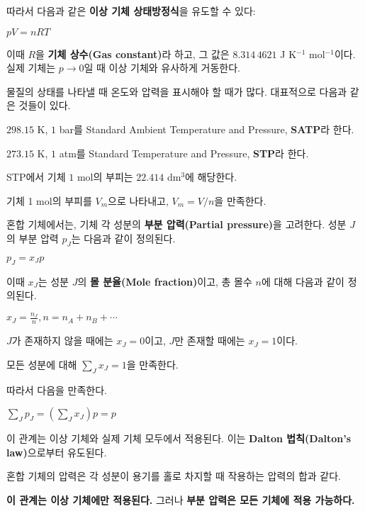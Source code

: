             따라서 다음과 같은 \textbf{이상 기체 상태방정식}을 유도할 수 있다:
                \begin{thm}[이상 기체 상태방정식]
                    $pV = nRT$
                \end{thm}
            이때 $R$을 \textbf{기체 상수(Gas constant)}라 하고, 그 값은 $8.314\,4621$ \textrm{J K$^{-1}$ mol$^{-1}$}이다. 
            실제 기체는 $p \rightarrow 0$일 때 이상 기체와 유사하게 거동한다.
            \par 물질의 상태를 나타낼 때 온도와 압력을 표시해야 할 때가 많다. 대표적으로 다음과 같은 것들이 있다.
            \begin{defn}[SATP]
                $298.15$ \textrm{K}, $1$ \textrm{bar}를 Standard Ambient Temperature and Pressure, \textbf{SATP}라 한다.
            \end{defn}
            \begin{defn}[STP]
            $273.15$ \textrm{K}, $1$ \textrm{atm}를 Standard Temperature and Pressure, \textbf{STP}라 한다.
            \end{defn}
            STP에서 기체 $1$ \textrm{mol}의 부피는 
            $22.414$ \textrm{dm}$^3$에 해당한다.
            \begin{defn}[몰 부피]
            기체 1 \textrm{mol}의 부피를 $V_m$으로 나타내고, $V_m = V/n$을 만족한다.
            \end{defn}
            \par 혼합 기체에서는, 기체 각 성분의 \textbf{부분 압력(Partial pressure)}을 고려한다. 성분 $J$의 부분 압력 $p_J$는 다음과 같이 정의된다.
            \begin{defn}[부분 압력]
                $p_J = x_J p$
            \end{defn}
            이때 $x_J$는 성분 $J$의 \textbf{몰 분율(Mole fraction)}이고, 총 몰수 $n$에 대해 다음과 같이 정의된다.
                \begin{defn}[몰 분율]
                    $x_J = \displaystyle\frac{n_J}{n}, n = n_A + n_B + \cdots$
                \end{defn}
            $J$가 존재하지 않을 때에는 $x_J = 0$이고, $J$만 존재할 때에는 $x_J = 1$이다. 
            \begin{cor}
                모든 성분에 대해 $\displaystyle\sum_{J} x_J = 1$을 만족한다.
            \end{cor} 
            따라서 다음을 만족한다.
                \begin{cor}
                    $\displaystyle\sum_{J} p_J = \left( \sum_{J} x_J \right) p = p$
                \end{cor}
            이 관계는 이상 기체와 실제 기체 모두에서 적용된다. 이는 \textbf{Dalton 법칙(Dalton's law)}으로부터 유도된다.
            \begin{law}[Dalton 법칙]
            혼합 기체의 압력은 각 성분이 용기를 홀로 차지할 때 작용하는 압력의 합과 같다.
            \end{law}
            \begin{warn}
            \textbf{이 관계는 이상 기체에만 적용된다.} 그러나 \textbf{부분 압력은 모든 기체에 적용 가능하다.}
            \end{warn}
